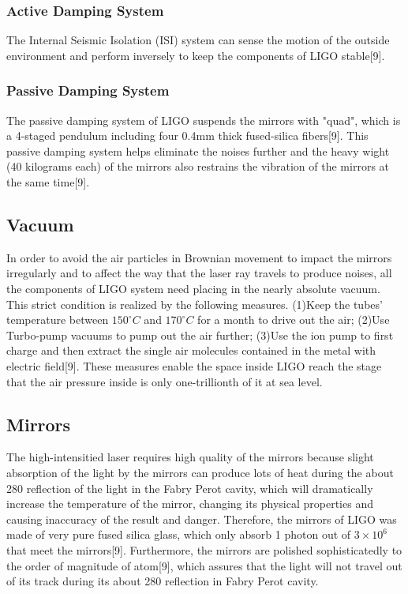 \documentclass[journal,comsoc,twoside]{IEEEtran}
\begin{document}
\subsubsection{Active Damping System}
The Internal Seismic Isolation (ISI) system can sense the motion of the outside environment and perform inversely to keep the components of LIGO stable[9].
\subsubsection{Passive Damping System}
The passive damping system of LIGO suspends the mirrors with "quad", which is a 4-staged pendulum including four 0.4mm thick fused-silica fibers[9]. This passive damping system helps eliminate the noises further and the heavy wight (40 kilograms each) of the mirrors also restrains the vibration of the mirrors at the same time[9].
\subsection{Vacuum}
In order to avoid the air particles in Brownian movement to impact the mirrors irregularly and to affect the way that the laser ray travels to produce noises, all the components of LIGO system need placing in the nearly absolute vacuum. This strict condition is realized by the following measures. (1)Keep the tubes' temperature between $150 ^\circ C$ and $170 ^\circ C$ for a month to drive out the air; (2)Use Turbo-pump vacuums to pump out the air further; (3)Use the ion pump to first charge and then extract the single air molecules contained in the metal with electric field[9]. These measures enable the space inside LIGO reach the stage that the air pressure inside is only one-trillionth of it at sea level.
\subsection{Mirrors}
The high-intensitied laser requires high quality of the mirrors because slight absorption of the light by the mirrors can produce lots of heat during the about 280 reflection of the light in the Fabry Perot cavity, which will dramatically increase the temperature of the mirror, changing its physical properties and causing inaccuracy of the result and danger. Therefore, the mirrors of LIGO was made of very pure fused silica glass, which only absorb 1 photon out of $3\times{10}^6$ that meet the mirrors[9]. Furthermore, the mirrors are polished sophisticatedly to the order of magnitude of atom[9], which assures that the light will not travel out of its track during its about 280 reflection in Fabry Perot cavity.
\end{document}
